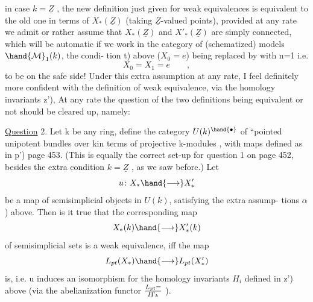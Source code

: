 
in case $k=\underline{Z}$ ,  the new definition just given for weak equivalences is
equivalent to the old one in terms of $X_*(\underline{Z})$  (taking $\underline{Z}$-valued points),
provided at any rate we admit  or rather assume that $X_*(\underline{Z})$ 
 and $X'_*(\underline{Z})$  are simply connected, which will be automatic if
we work in the category of (schematized) models $\hand{\mathcal{M}}_1(k)$,   the condi-%
tion \hand{(}t) above  ($X_0 = e$)  being replaced by   with n=1  i.e. 
\margin{($\alpha$)}
\[ X_0 = X_1 = e \qquad , \]
to be on the safe side!  Under this extra assumption at any rate,  I feel
definitely more confident with the  definition of weak equivalence,
via the homology invariants \hand{(}z'),  At any rate the question of the two
definitions being equivalent or not should be cleared up,  namely:

\uline{Question} 2.   Let k be any ring,  define the category $U(k)^{\hand{\bullet}}$ of ``pointed
unipotent bundles over kin terms of projective k-modules ,  with maps
defined as in \hand{(}p')  page 453. (This is equally the correct set-up for
question 1 on page 452,  besides the extra condition $k=\underline{Z}$ , as we saw
before.)  Let
\[ u\colon X_* \hand{\longrightarrow} X'_* \]
be a map of semisimplicial objects in $U(k)$,  satisfying  the extra assump-%
tions \hand{(}$\alpha$) above.   Then is it true  that the corresponding map 
\margin{($\beta$)}
\[ X_*(k) \hand{\longrightarrow} X'_*(k) \]
of semisimplicial sets is a weak equivalence, iff  the map
\[ L_{pt}(X_*) \hand{\longrightarrow} L_{pt}(X'_*) \]
is,  i.e.  u induces an isomorphism for the homology invariants $H_i$
defined in \hand{(}z') above (via the abelianization functor  $L_{pt} = \over{I}{\Gamma}_k$ ).

